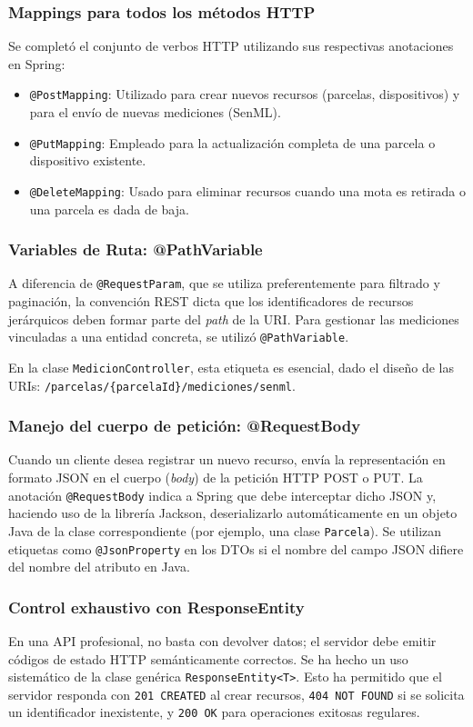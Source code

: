 \documentclass[12pt,a4paper]{article}
\begin{document}
\subsubsection{Mappings para todos los métodos HTTP}
Se completó el conjunto de verbos HTTP utilizando sus respectivas anotaciones en Spring:
\begin{itemize}
    \item \texttt{@PostMapping}: Utilizado para crear nuevos recursos (parcelas, dispositivos) y para el envío de nuevas mediciones (SenML).
    \item \texttt{@PutMapping}: Empleado para la actualización completa de una parcela o dispositivo existente.
    \item \texttt{@DeleteMapping}: Usado para eliminar recursos cuando una mota es retirada o una parcela es dada de baja.
\end{itemize}

\subsubsection{Variables de Ruta: @PathVariable}
A diferencia de \texttt{@RequestParam}, que se utiliza preferentemente para filtrado y paginación, la convención REST dicta que los identificadores de recursos jerárquicos deben formar parte del \textit{path} de la URI. Para gestionar las mediciones vinculadas a una entidad concreta, se utilizó \texttt{@PathVariable}. 

En la clase \texttt{MedicionController}, esta etiqueta es esencial, dado el diseño de las URIs: \texttt{/parcelas/\{parcelaId\}/mediciones/senml}.

\subsubsection{Manejo del cuerpo de petición: @RequestBody}
Cuando un cliente desea registrar un nuevo recurso, envía la representación en formato JSON en el cuerpo (\textit{body}) de la petición HTTP POST o PUT. La anotación \texttt{@RequestBody} indica a Spring que debe interceptar dicho JSON y, haciendo uso de la librería Jackson, deserializarlo automáticamente en un objeto Java de la clase correspondiente (por ejemplo, una clase \texttt{Parcela}). Se utilizan etiquetas como \texttt{@JsonProperty} en los DTOs si el nombre del campo JSON difiere del nombre del atributo en Java.

\subsubsection{Control exhaustivo con ResponseEntity}
En una API profesional, no basta con devolver datos; el servidor debe emitir códigos de estado HTTP semánticamente correctos. Se ha hecho un uso sistemático de la clase genérica \texttt{ResponseEntity<T>}. Esto ha permitido que el servidor responda con \texttt{201 CREATED} al crear recursos, \texttt{404 NOT FOUND} si se solicita un identificador inexistente, y \texttt{200 OK} para operaciones exitosas regulares.
\end{document}
